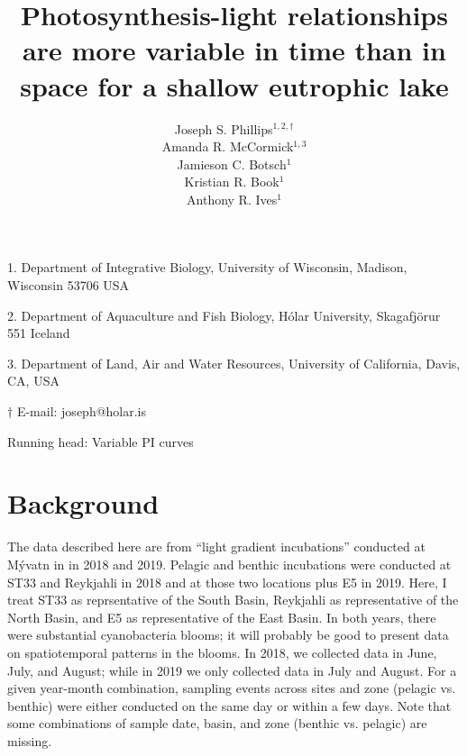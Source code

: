 \documentclass[12pt]{article}
\title{Photosynthesis-light relationships are more variable in time than in space 
        for a shallow eutrophic lake}
\author{
Joseph S. Phillips$^{1,2,\dagger}$ \\
Amanda R. McCormick$^{1,3}$ \\
Jamieson C. Botsch$^{1}$ \\
Kristian R. Book$^{1}$ \\
Anthony R. Ives$^{1}$}
\date{}
\begin{document}
\raggedright
\setlength\parindent{0.25in}

\maketitle

\noindent{} 1. Department of Integrative Biology, University of Wisconsin, Madison, Wisconsin 53706 USA

\noindent{} 2. Department of Aquaculture and Fish Biology, H\'{o}lar University, Skagafj\"{o}r{\dh}ur 551 Iceland

\noindent{} 3. Department of Land, Air and Water Resources, 
University of California, Davis, CA, USA

\noindent{} $\dagger$ E-mail: joseph@holar.is

\bigskip

Running head: {Variable PI curves}

\linenumbers{}

\clearpage






% 
% 






\section*{Background}

The data described here are from ``light gradient incubations'' 
conducted at M\'{y}vatn in in 2018 and 2019. 
Pelagic and benthic incubations were conducted at ST33 and Reykjahli{\dh} in 2018
and at those two locations plus E5 in 2019. 
Here, I treat ST33 as reprsentative of the South Basin,
Reykjahli{\dh} as representative of the North Basin,
and E5 as representative of the East Basin.
In both years, there were substantial cyanobacteria blooms; 
it will probably be good to present data on spatiotemporal patterns in the blooms.
In 2018, we collected data in June, July, and August;
while in 2019 we only collected data in July and August.
For a given year-month combination, 
sampling events across sites and zone (pelagic vs. benthic)
were either conducted on the same day or within a few days.
Note that some combinations of sample date, basin, 
and zone (benthic vs. pelagic) are missing.
\end{document}
